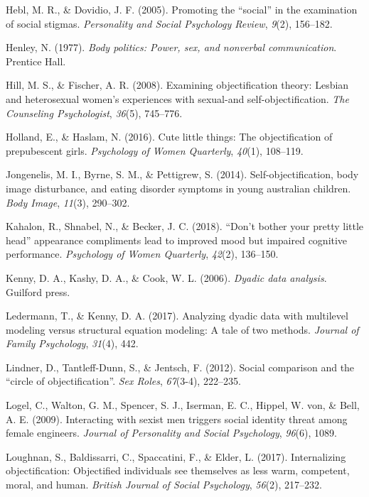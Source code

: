 \documentclass[man]{apa6}
\begin{document}
\hypertarget{ref-hebl2005promoting}{}
Hebl, M. R., \& Dovidio, J. F. (2005). Promoting the ``social'' in the
examination of social stigmas. \emph{Personality and Social Psychology
Review}, \emph{9}(2), 156--182.

\hypertarget{ref-henley1977body}{}
Henley, N. (1977). \emph{Body politics: Power, sex, and nonverbal
communication}. Prentice Hall.

\hypertarget{ref-hill2008examining}{}
Hill, M. S., \& Fischer, A. R. (2008). Examining objectification theory:
Lesbian and heterosexual women's experiences with sexual-and
self-objectification. \emph{The Counseling Psychologist}, \emph{36}(5),
745--776.

\hypertarget{ref-holland2016}{}
Holland, E., \& Haslam, N. (2016). Cute little things: The
objectification of prepubescent girls. \emph{Psychology of Women
Quarterly}, \emph{40}(1), 108--119.

\hypertarget{ref-jongenelis2014}{}
Jongenelis, M. I., Byrne, S. M., \& Pettigrew, S. (2014).
Self-objectification, body image disturbance, and eating disorder
symptoms in young australian children. \emph{Body Image}, \emph{11}(3),
290--302.

\hypertarget{ref-kahalon2018don}{}
Kahalon, R., Shnabel, N., \& Becker, J. C. (2018). ``Don't bother your
pretty little head'' appearance compliments lead to improved mood but
impaired cognitive performance. \emph{Psychology of Women Quarterly},
\emph{42}(2), 136--150.

\hypertarget{ref-kenny2006dyadic}{}
Kenny, D. A., Kashy, D. A., \& Cook, W. L. (2006). \emph{Dyadic data
analysis}. Guilford press.

\hypertarget{ref-ledermann2017analyzing}{}
Ledermann, T., \& Kenny, D. A. (2017). Analyzing dyadic data with
multilevel modeling versus structural equation modeling: A tale of two
methods. \emph{Journal of Family Psychology}, \emph{31}(4), 442.

\hypertarget{ref-lindner2012social}{}
Lindner, D., Tantleff-Dunn, S., \& Jentsch, F. (2012). Social comparison
and the ``circle of objectification''. \emph{Sex Roles}, \emph{67}(3-4),
222--235.

\hypertarget{ref-logel2009interacting}{}
Logel, C., Walton, G. M., Spencer, S. J., Iserman, E. C., Hippel, W.
von, \& Bell, A. E. (2009). Interacting with sexist men triggers social
identity threat among female engineers. \emph{Journal of Personality and
Social Psychology}, \emph{96}(6), 1089.

\hypertarget{ref-loughnan2017internalizing}{}
Loughnan, S., Baldissarri, C., Spaccatini, F., \& Elder, L. (2017).
Internalizing objectification: Objectified individuals see themselves as
less warm, competent, moral, and human. \emph{British Journal of Social
Psychology}, \emph{56}(2), 217--232.
\end{document}
